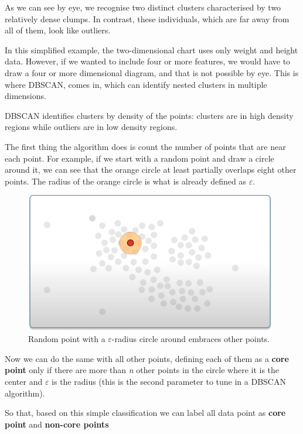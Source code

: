     As we can see by eye, we recognise two distinct clusters characterised by two relatively dense clumps. In contrast, these individuals, which are far away from all of them, look like outliers.
    
    In this simplified example, the two-dimensional chart uses only weight and height data. However, if we wanted to include four or more features, we would have to draw a four or more dimensional diagram, and that is not possible by eye. This is where DBSCAN,  comes in, which can identify nested clusters in multiple dimensions.
    
    DBSCAN identifies clusters by density of the points: clusters are in high density regions while outliers are in low density regions.
    
    The first thing the algorithm does is count the number of points that are near each point. For example, if we start with a random point and draw a circle around it, we can see that the orange circle at least partially overlaps eight other points. The radius of the orange circle is what is already defined as $\varepsilon$.
    
    \begin{figure}[H]
        \centering
        \includegraphics[width=11cm]{Images/1/dbscan-ex-2.png}
        \caption{Random point with a $\varepsilon$-radius circle around embraces other points.}
    \end{figure}
    
    Now we can do the same with all other points, defining each of them as a \textbf{core point} only if there are more than \textit{n} other points in the circle where it is the center and $\varepsilon$ is the radius (this is the second parameter to tune in a DBSCAN algorithm).
    
    So that, based on this simple classification we can label all data point as \textbf{core point} and \textbf{non-core points}

